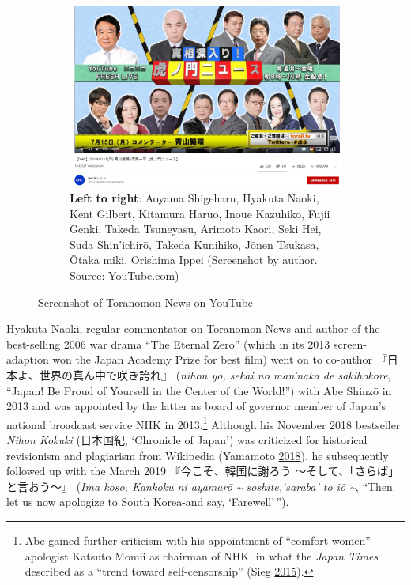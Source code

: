 \documentclass[10pt,british,A4paper,,openany]{memoir}
\begin{document}
\begin{figure}[!htb]
 \centering
 \begin{subfigure}[b]{0.5\textwidth}
  \includegraphics[width=\textwidth]{images/2channel/toranomon.jpg} 
  \captionsetup[sub]{font=scriptsize}
  \caption*{\textbf{Left to right}: Aoyama Shigeharu, Hyakuta Naoki, Kent Gilbert, Kitamura Haruo, Inoue Kazuhiko, Fujii Genki, Takeda Tsuneyasu, Arimoto Kaori, Seki Hei, Suda Shin'ichirō, Takeda Kunihiko, Jōnen Tsukasa, Ōtaka miki, Orishima Ippei (Screenshot by author. Source: YouTube.com)}
 \end{subfigure}
 \caption{Screenshot of Toranomon News on YouTube}\label{fig:toranomon}
\end{figure}

Hyakuta Naoki, regular commentator on Toranomon News and author of the
best-selling 2006 war drama ``The Eternal Zero'' (which in its 2013
screen-adaption won the Japan Academy Prize for best film) went on to
co-author 『日本よ、世界の真ん中で咲き誇れ』 (\emph{nihon yo, sekai no
man'naka de sakihokore}, ``Japan! Be Proud of Yourself in the Center of
the World!'') with Abe Shinzō in 2013 and was appointed by the latter as
board of governor member of Japan's national broadcast service NHK in
2013.\footnote{Abe gained further criticism with his appointment of
  ``comfort women'' apologist Katsuto Momii as chairman of NHK, in what
  the \emph{Japan Times} described as a ``trend toward self-censorship''
  (Sieg \protect\hyperlink{ref-sieg_under_2015}{2015}).} Although his
November 2018 bestseller \emph{Nihon Kokuki} (日本国紀, `Chronicle of
Japan') was criticized for historical revisionism and plagiarism from
Wikipedia (Yamamoto \protect\hyperlink{ref-yamamoto__2018}{2018}), he
subsequently followed up with the March 2019 『今こそ、韓国に謝ろう
～そして、「さらば」と言おう～』 (\emph{Ima koso, Kankoku ni ayamarō
\textasciitilde{} soshite,`saraba' to iō \textasciitilde{}}, ``Then let
us now apologize to South Korea-and say, `Farewell'\,'').
\end{document}
